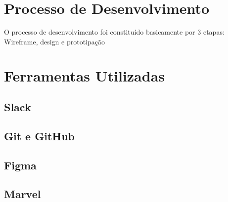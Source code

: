 \section{Processo de Desenvolvimento}

O processo de desenvolvimento foi constituído basicamente por 3 etapas: Wireframe, design e prototipação

\section{Ferramentas Utilizadas}

\subsection{Slack}

\subsection{Git e GitHub}

\subsection{Figma}

\subsection{Marvel}
